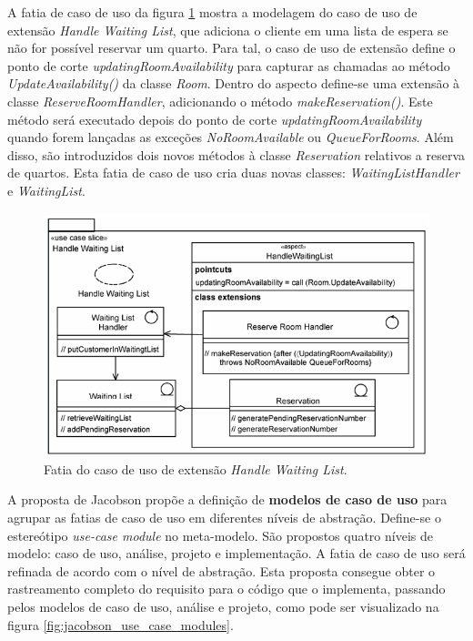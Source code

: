 A fatia de caso de uso da figura \ref{fig:jacobson_handle_waiting_list_slice} mostra a modelagem do caso de uso de extensão \textit{Handle Waiting
List}, que adiciona o cliente em uma lista de espera se não for possível reservar um quarto. Para tal, o caso de uso de extensão define o ponto de
corte \textit{updatingRoomAvailability} para capturar as chamadas ao método \textit{UpdateAvailability()} da classe \textit{Room}. Dentro do aspecto
define-se uma extensão à classe \textit{ReserveRoomHandler}, adicionando o método \textit{makeReservation()}. Este método será executado depois
do ponto de corte \textit{updatingRoomAvailability} quando forem lançadas as exceções \textit{NoRoomAvailable} ou \textit{QueueForRooms}. Além disso,
são introduzidos dois novos métodos à classe \textit{Reservation} relativos a reserva de quartos. Esta fatia de caso de uso cria duas novas classes:
\textit{WaitingListHandler} e \textit{WaitingList}.

\begin{figure}
	\centering
	\includegraphics[width=450px]{img/jacobson_handle_waiting_list_slice.png}
	\caption{Fatia do caso de uso de extensão
	\textit{Handle Waiting List}.}\label{fig:jacobson_handle_waiting_list_slice}
\end{figure}

A proposta de Jacobson propõe a definição de \textbf{modelos de caso de uso} para agrupar as fatias de caso de uso em
diferentes níveis de abstração. Define-se o estereótipo \textit{use-case module} no meta-modelo. São propostos quatro níveis de modelo: caso de uso,
análise, projeto e implementação. A fatia de caso de uso será refinada de acordo com o nível de abstração. Esta proposta consegue obter o rastreamento
completo do requisito para o código que o implementa, passando pelos modelos de caso de uso, análise e projeto, como pode ser visualizado 
na figura \ref{fig:jacobson_use_case_modules}. 

